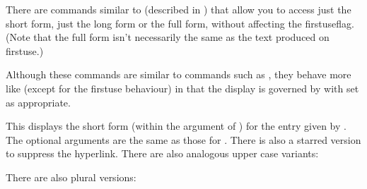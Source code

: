 \documentclass[report,inlinetitle]{nlctdoc}
\newcommand*{\firstuse}{\gls{firstuse}}
\begin{document}
There are commands similar to  (described in
) that allow you to access just the short
form, just the long form or the full form, without affecting the
\gls{firstuseflag}. (Note that the full form isn't necessarily the same
as the text produced on \firstuse.)

\begin{important}
Although these commands are
similar to commands such as , they behave more like
 (except for the \gls*{firstuse} behaviour) in that
the display is governed by  with
 set as appropriate.
\end{important}

\begin{definition}[\DescribeMacro{\acrshort}]
\end{definition}
This displays the short form (within the argument of ) for the entry given by .
The optional arguments are the same as those for .
There is also a starred version to suppress the hyperlink. There are
also analogous upper case variants:
\begin{definition}[\DescribeMacro{\Acrshort}]
\end{definition}
\begin{definition}[\DescribeMacro{\ACRshort}]
\end{definition}
There are also plural versions:
\begin{definition}[\DescribeMacro\acrshortpl]
\end{definition}
\begin{definition}[\DescribeMacro\Acrshortpl]
\end{definition}
\begin{definition}[\DescribeMacro\ACRshortpl]
\end{definition}
\end{document}
